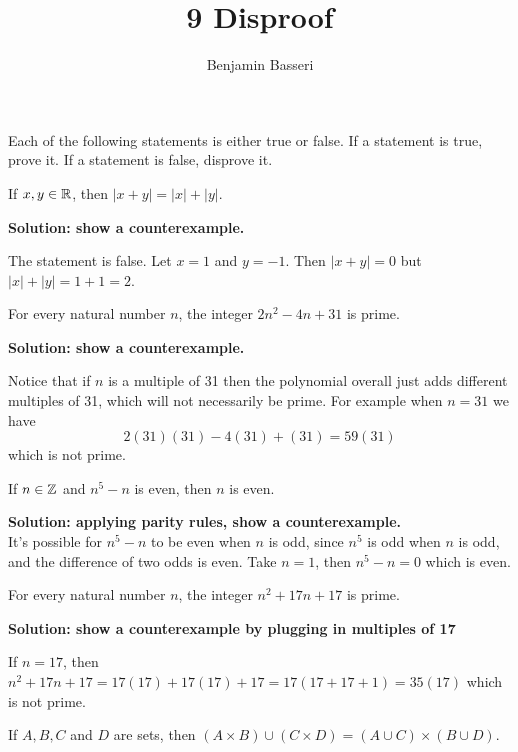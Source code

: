 \documentclass{article}
\title{9 Disproof}
\author{Benjamin Basseri}
\begin{document}
\maketitle

Each of the following statements is either true or false. If a statement is true, prove it. If a statement is false, disprove it.

\begin{problem}
If $x, y \in \mathbb{R}$, then $|x + y| = |x| + |y|$.
\end{problem}

\textbf{Solution: show a counterexample.}

The statement is false. Let $x = 1$ and $y = -1$. Then $|x + y| = 0$ but $|x| + |y| = 1 + 1 = 2$.

\begin{problem}
For every natural number $n$, the integer $2n^2 - 4n + 31$ is prime.
\end{problem}

\textbf{Solution: show a counterexample.}

Notice that if $n$ is a multiple of 31 then the polynomial overall just adds different multiples of 31, which will not necessarily be prime. For example when $n = 31$ we have
$$2(31)(31) - 4(31) + (31) = 59(31)$$
which is not prime.

\begin{problem}
If $n \in \mathbb{Z}$ and $n^5 - n$ is even, then $n$ is even.
\end{problem}

\textbf{Solution: applying parity rules, show a counterexample.}
\\
It's possible for $n^5 - n$ to be even when $n$ is odd, since $n^5$ is odd when $n$ is odd, and the difference of two odds is even. Take $n = 1$, then $n^5 - n = 0$ which is even.

\begin{problem}
For every natural number $n$, the integer $n^2 + 17n + 17$ is prime.
\end{problem}

\textbf{Solution: show a counterexample by plugging in multiples of 17}

If $n = 17$, then $n^2 + 17n + 17 = 17(17) + 17(17) + 17 = 17(17 + 17 + 1) = 35(17)$ which is not prime.

\begin{problem}
If $A, B, C$ and $D$ are sets, then $(A \times B) \cup (C \times D) = (A \cup C) \times (B \cup D)$.
\end{problem}
\end{document}
